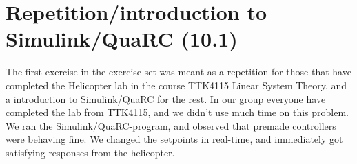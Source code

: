 \section{Repetition/introduction to Simulink/QuaRC (10.1)}

The first exercise in the exercise set was meant as a repetition for those that have completed the Helicopter lab in the course TTK4115 Linear System Theory, and a introduction to Simulink/QuaRC for the rest. In our group everyone have completed the lab from TTK4115, and we didn't use much time on this problem. We ran the Simulink/QuaRC-program, and observed that premade controllers were behaving fine. We changed the setpoints in real-time, and immediately got satisfying responses from the helicopter.